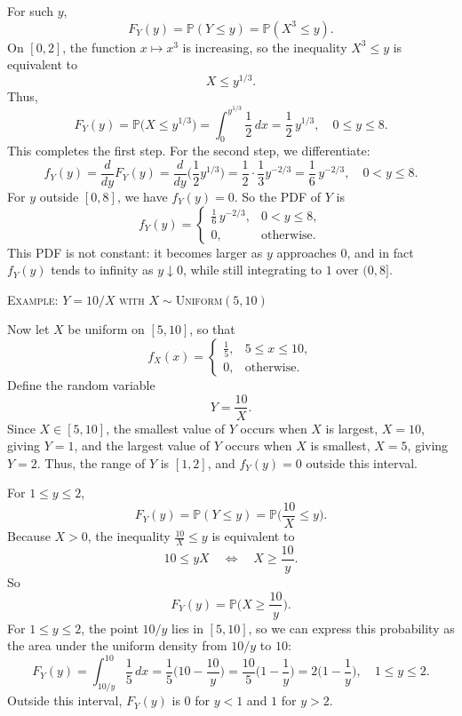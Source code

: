 For such \(y\),
\[
F_Y(y)
=
\mathbb{P}(Y \le y)
=
\mathbb{P}(X^{3} \le y).
\]
On \([0,2]\), the function \(x \mapsto x^{3}\) is increasing, so the inequality \(X^{3} \le y\) is equivalent to
\[
X \le y^{1/3}.
\]
Thus,
\[
F_Y(y)
=
\mathbb{P}\big(X \le y^{1/3}\big)
=
\int_{0}^{y^{1/3}} \frac{1}{2}\,dx
=
\frac{1}{2}\,y^{1/3},
\quad 0 \le y \le 8.
\]
This completes the first step.  
For the second step, we differentiate:
\[
f_Y(y)
=
\frac{d}{dy}F_Y(y)
=
\frac{d}{dy}\Big(\frac{1}{2}y^{1/3}\Big)
=
\frac{1}{2}\cdot\frac{1}{3}y^{-2/3}
=
\frac{1}{6}\,y^{-2/3},
\quad 0 < y \le 8.
\]
For \(y\) outside \([0,8]\), we have \(f_Y(y)=0\).  
So the PDF of \(Y\) is
\[
f_Y(y)
=
\begin{cases}
\frac{1}{6}\,y^{-2/3}, & 0<y\le 8,\\[4pt]
0, & \text{otherwise}.
\end{cases}
\]
This PDF is not constant: it becomes larger as \(y\) approaches \(0\), and in fact \(f_Y(y)\) tends to infinity as \(y \downarrow 0\), while still integrating to \(1\) over \((0,8]\).

\textsc{Example: \(Y = 10/X\) with \(X \sim \text{Uniform}(5,10)\)}

Now let \(X\) be uniform on \([5,10]\), so that
\[
f_X(x)
=
\begin{cases}
\frac{1}{5}, & 5 \le x \le 10,\\[4pt]
0, & \text{otherwise}.
\end{cases}
\]
Define the random variable
\[
Y = \frac{10}{X}.
\]
Since \(X \in [5,10]\), the smallest value of \(Y\) occurs when \(X\) is largest, \(X=10\), giving \(Y=1\), and the largest value of \(Y\) occurs when \(X\) is smallest, \(X=5\), giving \(Y=2\).  
Thus, the range of \(Y\) is \([1,2]\), and \(f_Y(y)=0\) outside this interval.

For \(1 \le y \le 2\),
\[
F_Y(y)
=
\mathbb{P}(Y \le y)
=
\mathbb{P}\Big(\frac{10}{X} \le y\Big).
\]
Because \(X>0\), the inequality \(\frac{10}{X} \le y\) is equivalent to
\[
10 \le yX
\quad\Longleftrightarrow\quad
X \ge \frac{10}{y}.
\]
So
\[
F_Y(y)
=
\mathbb{P}\Big(X \ge \frac{10}{y}\Big).
\]
For \(1 \le y \le 2\), the point \(10/y\) lies in \([5,10]\), so we can express this probability as the area under the uniform density from \(10/y\) to \(10\):
\[
F_Y(y)
=
\int_{10/y}^{10} \frac{1}{5}\,dx
=
\frac{1}{5}\Big(10 - \frac{10}{y}\Big)
=
\frac{10}{5}\Big(1 - \frac{1}{y}\Big)
=
2\Big(1 - \frac{1}{y}\Big),
\quad 1 \le y \le 2.
\]
Outside this interval, \(F_Y(y)\) is \(0\) for \(y<1\) and \(1\) for \(y>2\).

